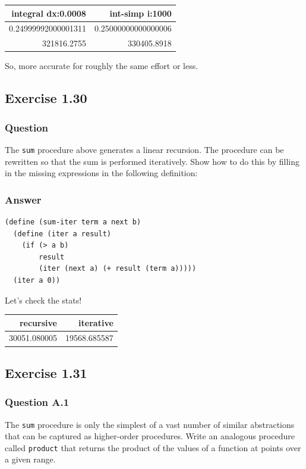 \documentclass[final,fleqn,titlepage,twoside]{article}
\begin{document}
\begin{center}
\begin{tabular}{rr}
integral dx:0.0008 & int-simp i:1000\\[0pt]
\hline
0.24999992000001311 & 0.25000000000000006\\[0pt]
321816.2755 & 330405.8918\\[0pt]
\end{tabular}
\end{center}

So, more accurate for roughly the same effort or less.

\subsection{Exercise 1.30}
\label{sec:org8d29d18}
\subsubsection{Question}
\label{sec:org3b18f90}
The \texttt{sum} procedure above generates a linear recursion. The procedure
can be rewritten so that the sum is performed iteratively. Show how to do this
by filling in the missing expressions in the following definition:

\subsubsection{Answer}
\label{sec:orgcf0f650}
\begin{verbatim}
(define (sum-iter term a next b)
  (define (iter a result)
    (if (> a b)
        result
        (iter (next a) (+ result (term a)))))
  (iter a 0))
\end{verbatim}

Let's check the stats!
\begin{center}
\begin{tabular}{rr}
recursive & iterative\\[0pt]
\hline
30051.080005 & 19568.685587\\[0pt]
\end{tabular}
\end{center}

\subsection{Exercise 1.31}
\label{sec:orgf1e3529}
\subsubsection{Question A.1}
\label{sec:org6acef6c}
The \texttt{sum} procedure is only the simplest of a vast number of similar
abstractions that can be captured as higher-order procedures. Write an analogous
procedure called \texttt{product} that returns the product of the values of a
function at points over a given range.
\end{document}

